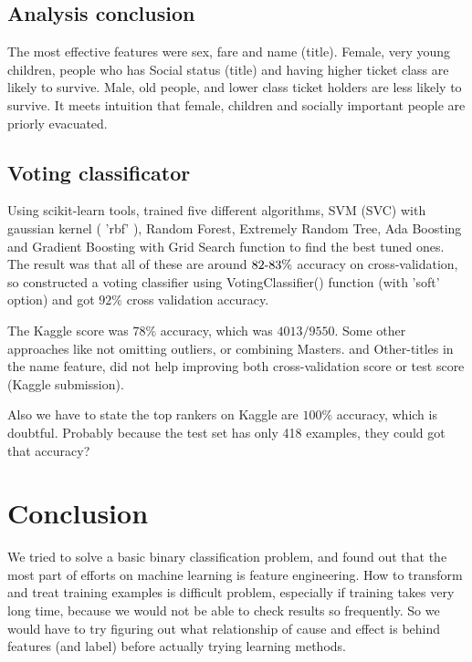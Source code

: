 \documentclass{article}
\begin{document}
\subsection{Analysis conclusion}
The most effective features were sex, fare and name (title).
Female, very young children, people who has Social status (title) and having higher ticket class are likely to survive.
Male, old people, and lower class ticket holders are less likely to survive.
It meets intuition that female, children and socially important people are priorly evacuated.

\subsection{Voting classificator}
Using scikit-learn tools, trained five different algorithms, SVM (SVC) with gaussian kernel ( 'rbf' ), Random Forest, Extremely Random Tree, Ada Boosting and Gradient Boosting with Grid Search function to find the best tuned ones.
The result was that all of these are around $82\mathchar`-83\%$ accuracy on cross-validation, so constructed a voting classifier using VotingClassifier() function (with 'soft' option) and got $92\%$ cross validation accuracy.

The Kaggle score was $78\%$ accuracy, which was $4013/9550$.
Some other approaches like not omitting outliers, or combining Masters. and Other-titles in the name feature, did not help improving both cross-validation score or test score (Kaggle submission).

Also we have to state the top rankers on Kaggle are $100\%$ accuracy, which is doubtful.
Probably because the test set has only 418 examples, they could got that accuracy?

\section{Conclusion}
We tried to solve a basic binary classification problem, and found out that the most part of efforts on machine learning is feature engineering.
How to transform and treat training examples is difficult problem, especially if training takes very long time, because we would not be able to check results so frequently.
So we would have to try figuring out what relationship of cause and effect is behind features (and label) before actually trying learning methods.
\end{document}
